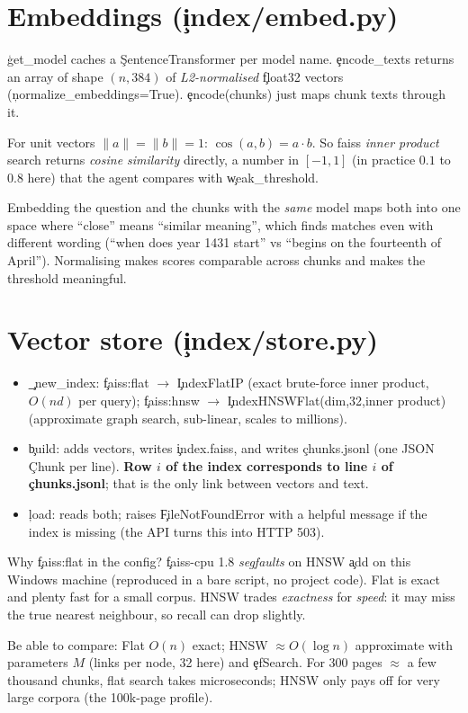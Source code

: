 \section{Embeddings (\c{index/embed.py})}
\c{get\_model} caches a \c{SentenceTransformer} per model name. \c{encode\_texts} returns an array of shape $(n,384)$ of \emph{L2-normalised} \c{float32} vectors (\c{normalize\_embeddings=True}). \c{encode(chunks)} just maps chunk texts through it.

\begin{keyidea}
For unit vectors $\|a\|=\|b\|=1$: $\cos(a,b)=a\cdot b$. So faiss \emph{inner product} search returns \emph{cosine similarity} directly, a number in $[-1,1]$ (in practice $0.1$ to $0.8$ here) that the agent compares with \c{weak\_threshold}.
\end{keyidea}
\begin{why}
Embedding the question and the chunks with the \emph{same} model maps both into one space where ``close'' means ``similar meaning'', which finds matches even with different wording (``when does year 1431 start'' vs ``begins on the fourteenth of April''). Normalising makes scores comparable across chunks and makes the threshold meaningful.
\end{why}

\section{Vector store (\c{index/store.py})}
\begin{itemize}
 \item \c{\_new\_index}: \c{faiss:flat} $\to$ \c{IndexFlatIP} (exact brute-force inner product, $O(nd)$ per query); \c{faiss:hnsw} $\to$ \c{IndexHNSWFlat(dim,32,inner product)} (approximate graph search, sub-linear, scales to millions).
 \item \c{build}: adds vectors, writes \c{index.faiss}, and writes \c{chunks.jsonl} (one JSON \c{Chunk} per line). \textbf{Row $i$ of the index corresponds to line $i$ of \c{chunks.jsonl}}; that is the only link between vectors and text.
 \item \c{load}: reads both; raises \c{FileNotFoundError} with a helpful message if the index is missing (the API turns this into HTTP 503).
\end{itemize}
\begin{gotcha}
Why \c{faiss:flat} in the config? \c{faiss-cpu 1.8} \emph{segfaults} on HNSW \c{add} on this Windows machine (reproduced in a bare script, no project code). Flat is exact and plenty fast for a small corpus. HNSW trades \emph{exactness} for \emph{speed}: it may miss the true nearest neighbour, so recall can drop slightly.
\end{gotcha}
\begin{tip}
Be able to compare: Flat $O(n)$ exact; HNSW $\approx O(\log n)$ approximate with parameters $M$ (links per node, 32 here) and \c{efSearch}. For 300 pages $\approx$ a few thousand chunks, flat search takes microseconds; HNSW only pays off for very large corpora (the 100k-page profile).
\end{tip}
